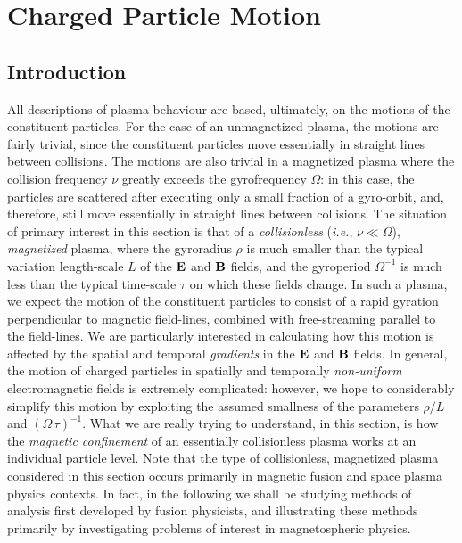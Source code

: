 \chapter {Charged Particle Motion}\label{s2}
\section{Introduction}
All descriptions of plasma behaviour are based, ultimately, on the motions
of the constituent particles. For the case of an unmagnetized plasma, the
motions are fairly trivial, since the constituent particles move 
essentially in
straight lines between collisions. The motions are also trivial in
a magnetized plasma where the collision frequency $\nu$ greatly exceeds the
gyrofrequency ${\Omega}$: in this case, the  particles are scattered
after executing only a small fraction  of a gyro-orbit, and, therefore, still move
essentially in straight lines between collisions. The situation of primary
interest in this section is that of a {\em collisionless}\/
({\em i.e.}, $\nu\ll {\Omega}$), {\em magnetized}\/ plasma, where the gyroradius
$\rho$ is much smaller than the typical variation length-scale $L$ of the 
${\bf E}$ and ${\bf B}$ fields, and the gyroperiod ${\Omega}^{-1}$ is
much less than the typical time-scale $\tau$ on which these fields change.
In such a plasma, we expect the motion of the constituent particles to consist
of a rapid  gyration perpendicular to
 magnetic field-lines, combined with free-streaming parallel
to the field-lines. We are particularly interested in calculating how
this motion is affected by the spatial and temporal {\em gradients}\/ in the 
${\bf E}$ and ${\bf B}$ fields. In general, the motion of charged particles
in spatially and temporally {\em non-uniform}\/ electromagnetic
fields is extremely complicated: however, 
we hope to considerably simplify this motion by exploiting the
assumed smallness of the parameters $\rho/L$ and $({\Omega}\,\tau)^{-1}$. 
What we are really trying to understand, in this section, is how the
{\em magnetic confinement}\/ of an essentially collisionless plasma works
at an individual particle level. 
Note that the type of collisionless, magnetized plasma considered in this
section occurs primarily in magnetic fusion and space plasma physics
contexts. In fact, in the following
we shall be studying  methods of analysis first developed by fusion
physicists, and 
illustrating these methods primarily 
by investigating problems of interest in magnetospheric physics. 

